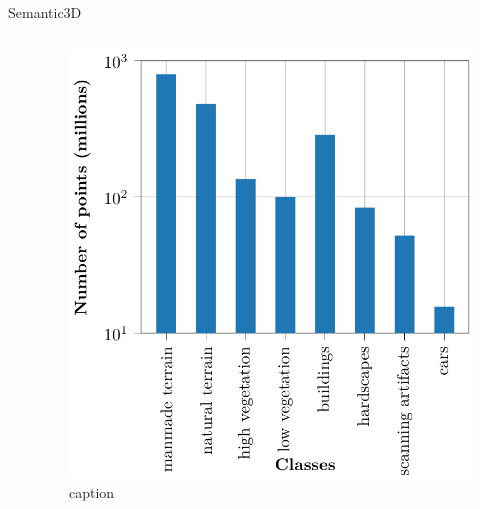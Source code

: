 \documentclass[aspectratio=169]{beamer}
\begin{document}
\begin{frame}{Semantic3D}
    \begin{columns}
        \begin{column}{0.5\textwidth}
            
        \end{column}
        \begin{column}{0.5\textwidth}
            \begin{figure}
                \centering
                \includegraphics[scale=0.25]{images/sem3d/sem3d_stats.jpg}
                \caption{caption}
                \label{fig:sem3d_stats}
            \end{figure}
        \end{column}
    \end{columns}
\end{frame}
\end{document}
